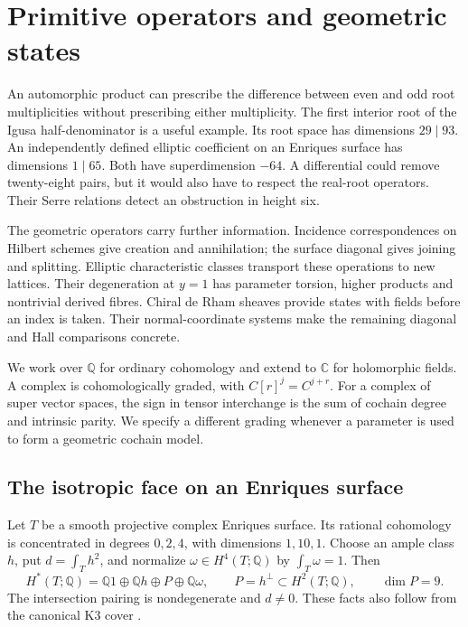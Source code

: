 \chapter{Primitive operators and geometric states}
\label{cyprim:chapter}

An automorphic product can prescribe the difference between even
and odd root multiplicities without prescribing either multiplicity.
The first interior root of the Igusa half-denominator is a useful
example. Its root space has dimensions $29\mid93$. An independently
defined elliptic coefficient on an Enriques surface has dimensions
$1\mid65$. Both have superdimension $-64$. A differential could remove
twenty-eight pairs, but it would also have to respect the real-root
operators. Their Serre relations detect an obstruction in height six.

The geometric operators carry further information. Incidence
correspondences on Hilbert schemes give creation and annihilation;
the surface diagonal gives joining and splitting. Elliptic
characteristic classes transport these operations to new lattices.
Their degeneration at $y=1$ has parameter torsion, higher products and
nontrivial derived fibres. Chiral de Rham sheaves provide states with
fields before an index is taken. Their normal-coordinate systems
make the remaining diagonal and Hall comparisons concrete.

We work over $\mathbb Q$ for ordinary cohomology and extend to
$\mathbb C$ for holomorphic fields. A complex is cohomologically
graded, with $C[r]^j=C^{j+r}$. For a complex of super vector spaces,
the sign in tensor interchange is the sum of cochain degree and
intrinsic parity. We specify a different grading whenever a
parameter is used to form a geometric cochain model.

\section{The isotropic face on an Enriques surface}
\label{cyprim:sec:face}

Let $T$ be a smooth projective complex Enriques surface. Its rational
cohomology is concentrated in degrees $0,2,4$, with dimensions
$1,10,1$. Choose an ample class $h$, put $d=\int_T h^2$, and normalize
$\omega\in H^4(T;\mathbb Q)$ by $\int_T\omega=1$. Then
\[
 H^*(T;\mathbb Q)=\mathbb Q1\oplus\mathbb Qh\oplus P\oplus\mathbb Q\omega,
 \qquad P=h^\perp\subset H^2(T;\mathbb Q),\qquad \dim P=9.
\]
The intersection pairing is nondegenerate and $d\ne0$.
These facts also follow from the canonical K3 cover
\cite[\S~3]{rewriteDolg2014}.

